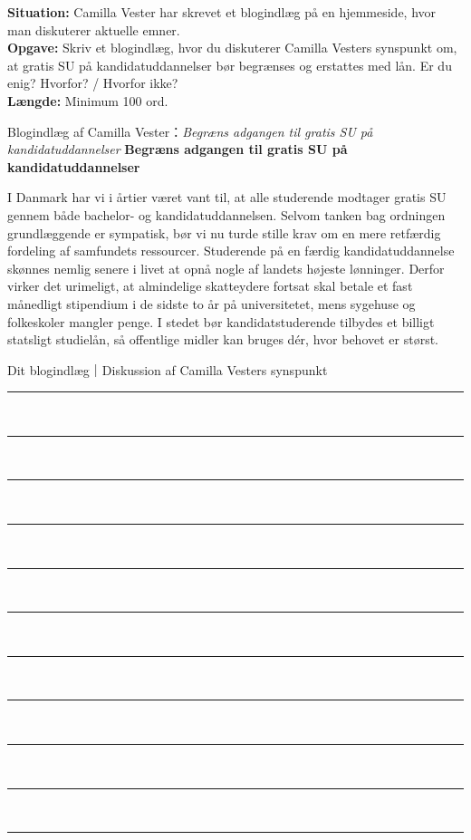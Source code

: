 \textbf{Situation:} Camilla Vester har skrevet et blogindlæg på en hjemmeside, hvor man diskuterer aktuelle emner.\\
\textbf{Opgave:} Skriv et blogindlæg, hvor du diskuterer Camilla Vesters synspunkt om, at gratis SU på kandidatuddannelser bør begrænses og erstattes med lån. Er du enig? Hvorfor? / Hvorfor ikke?\\
\textbf{Længde:} Minimum 100 ord.

\begin{emailbox}{Blogindlæg af Camilla Vester：\textit{Begræns adgangen til gratis SU på kandidatuddannelser}}
\textbf{\color{NCDNavy}Begræns adgangen til gratis SU på kandidatuddannelser}

\vspace{0.3em}
I Danmark har vi i årtier været vant til, at alle studerende modtager gratis SU gennem både bachelor- og kandidatuddannelsen. Selvom tanken bag ordningen grundlæggende er sympatisk, bør vi nu turde stille krav om en mere retfærdig fordeling af samfundets ressourcer. Studerende på en færdig kandidatuddannelse skønnes nemlig senere i livet at opnå nogle af landets højeste lønninger. Derfor virker det urimeligt, at almindelige skatteydere fortsat skal betale et fast månedligt stipendium i de sidste to år på universitetet, mens sygehuse og folkeskoler mangler penge. I stedet bør kandidatstuderende tilbydes et billigt statsligt studielån, så offentlige midler kan bruges dér, hvor behovet er størst.
\end{emailbox}

\begin{emailbox}{Dit blogindlæg｜Diskussion af Camilla Vesters synspunkt}
\vspace{0.3em}
\rule{\linewidth}{0.4pt}\\[0.55em]
\rule{\linewidth}{0.4pt}\\[0.55em]
\rule{\linewidth}{0.4pt}\\[0.55em]
\rule{\linewidth}{0.4pt}\\[0.55em]
\rule{\linewidth}{0.4pt}\\[0.55em]
\rule{\linewidth}{0.4pt}\\[0.55em]
\rule{\linewidth}{0.4pt}\\[0.55em]
\rule{\linewidth}{0.4pt}\\[0.55em]
\rule{\linewidth}{0.4pt}\\[0.55em]
\rule{\linewidth}{0.4pt}\\[0.55em]
\rule{\linewidth}{0.4pt}
\end{emailbox}

